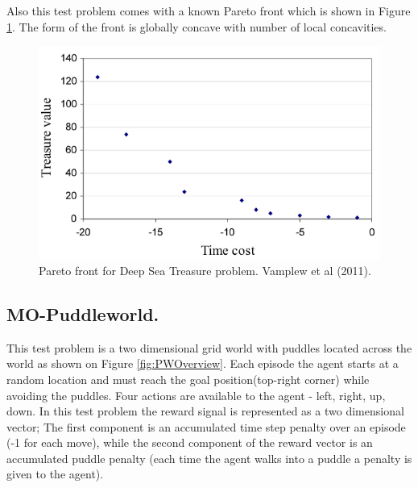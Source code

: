 Also this test problem comes with a known Pareto front which is shown in Figure \ref{fig:DSTFront}. The form of the front is globally concave with number of local concavities.

\begin{figure}[ht]
\vskip 0.2in
\centering
\includegraphics[scale=0.9]{dstPareto.png}
\caption{Pareto front for Deep Sea Treasure problem. Vamplew et al (2011).}
\label{fig:DSTFront}
\end{figure}

\subsection{MO-Puddleworld.}
\label{sec:mo-puddleworld}
This test problem is a two dimensional grid world with puddles located across the world as shown on Figure \ref{fig:PWOverview}. Each episode the agent starts at a random location and must reach the goal position(top-right corner) while avoiding the puddles. Four actions are available to the agent - left, right, up, down. In this test problem the reward signal is represented as a two dimensional vector; The first component is an accumulated time step penalty over an episode (-1 for each move), while the second component of the reward vector is an accumulated puddle penalty (each time the agent walks into a puddle a penalty is given to the agent).

